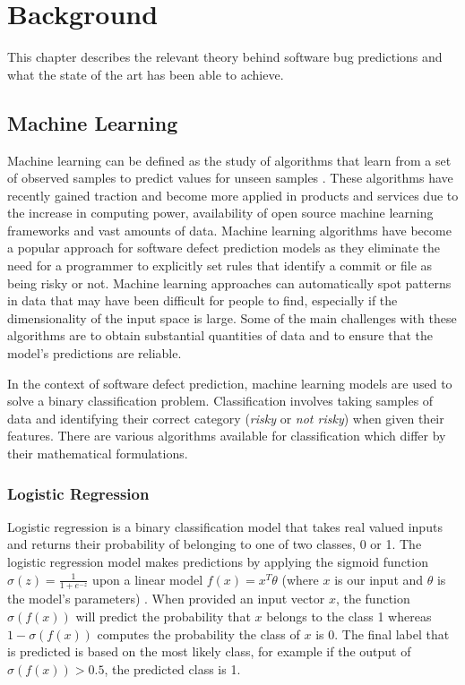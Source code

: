 \documentclass[../main.tex]{subfiles}
\begin{document}
\chapter{Background} \label{chapter:background}

This chapter describes the relevant theory behind software bug predictions and what the state of the art has been able to achieve. 

\section{Machine Learning} 

Machine learning can be defined as the study of algorithms that learn from a set of observed samples to predict values for unseen samples \cite{koza1996automated}. These algorithms have recently gained traction and become more applied in products and services due to the increase in computing power, availability of open source machine learning frameworks and vast amounts of data. Machine learning algorithms have become a popular approach for software defect prediction models as they eliminate the need for a programmer to explicitly set rules that identify a commit or file as being risky or not. Machine learning approaches can automatically spot patterns in data that may have been difficult for people to find, especially if the dimensionality of the input space is large. Some of the main challenges with these algorithms are to obtain substantial quantities of data and to ensure that the model's predictions are reliable.

In the context of software defect prediction, machine learning models are used to solve a binary classification problem. Classification involves taking samples of data and identifying their correct category (\textit{risky} or \textit{not risky}) when given their features. There are various algorithms available for classification which differ by their mathematical formulations.

\subsection{Logistic Regression}

Logistic regression is a binary classification model that takes real valued inputs and returns their probability of belonging to one of two classes, 0 or 1. The logistic regression model makes predictions by applying the sigmoid function $\sigma(z) = \frac{1}{1+e^{-z}}$ upon a linear model $f(x) = x^T\theta$ (where $x$ is our input and $\theta$ is the model's parameters) \cite{bishop2006pattern}. When provided an input vector $x$, the function $\sigma(f(x))$ will predict the probability that $x$ belongs to the class 1 whereas $1-\sigma(f(x))$ computes the probability the class of $x$ is 0. The final label that is predicted is based on the most likely class, for example if the output of $\sigma(f(x)) > 0.5$, the predicted class is 1.  
\end{document}
